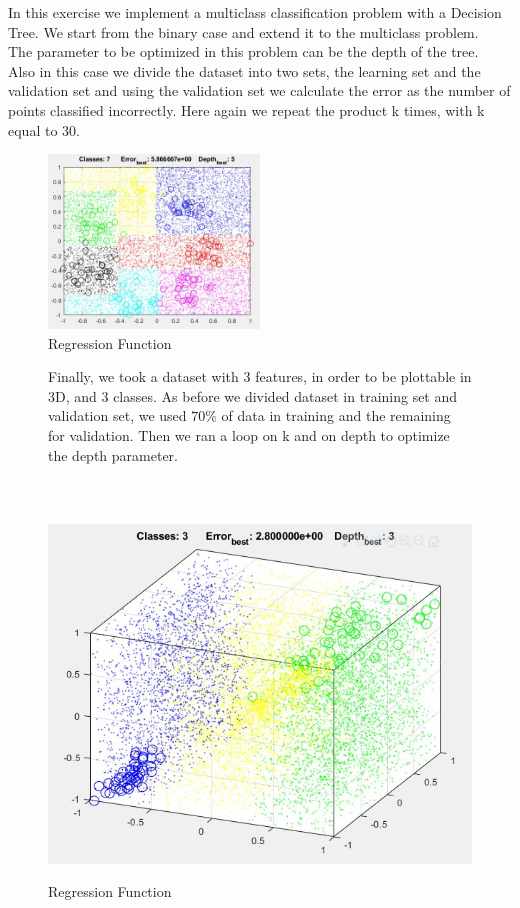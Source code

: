
In this exercise we implement a multiclass classification problem with a Decision Tree.
We start from the binary case and extend it to the multiclass problem.\\
The parameter to be optimized in this problem can be the depth of the tree.\\
Also in this case we divide the dataset into two sets, the learning set and the validation set and using the validation set we calculate the error as the number of points classified incorrectly. Here again we repeat the product k times, with k equal to 30.\\

\begin{figure}[h]
\centering
\includegraphics[width=0.5\textwidth]{i3.png}
\caption{Regression Function}
\label{fig:regression function}
\end{figure}
\begin{figure}[h]
Finally, we took a dataset with 3 features, in order to be plottable in 3D, and 3 classes. 
As before we divided dataset in training set and validation set, we used $ 70\%$ of data in training and the remaining for validation. Then we ran a loop on k and on depth to optimize the depth parameter.\\ \\ \\ \\


	\centering
	\includegraphics[width=1\textwidth]{i4.png}
	\caption{Regression Function}
	\label{fig:regression function}
\end{figure}
